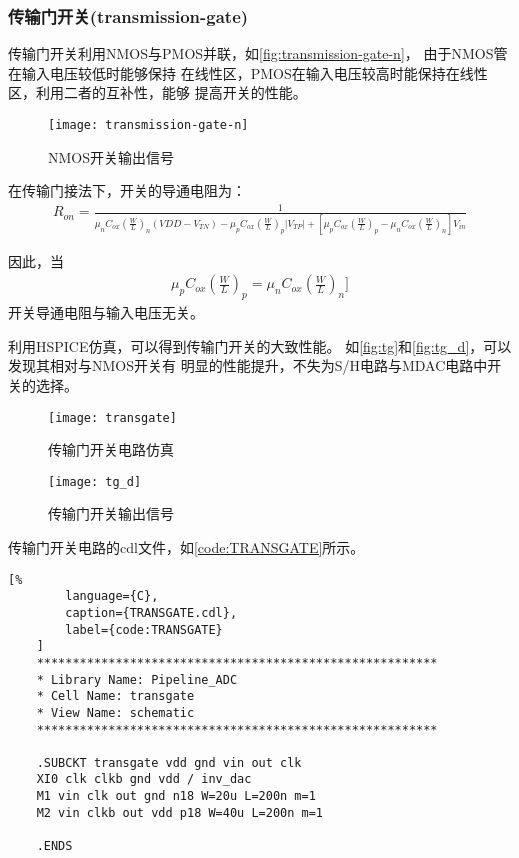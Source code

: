     \subsubsection{传输门开关(transmission-gate)}
    传输门开关利用NMOS与PMOS并联，如\autoref{fig:transmission-gate-n}，
    由于NMOS管在输入电压较低时能够保持
    在线性区，PMOS在输入电压较高时能保持在线性区，利用二者的互补性，能够
    提高开关的性能。
    \begin{figure}[H]
        \centering
        \texttt{[image: transmission-gate-n]}
        \caption{\label{fig:transmission-gate-n}NMOS开关输出信号}
    \end{figure}
    \par 在传输门接法下，开关的导通电阻为：
    \begin{align}
        R_{on} = \frac{1}{\mu_nC_{ox}(\frac{W}{L})_n(VDD-V_{TN}) - \mu_pC_{ox}(\frac{W}{L})_p|V_{TP}| + [\mu_pC_{ox}(\frac{W}{L})_p-\mu_nC_{ox}(\frac{W}{L})_n]V_{in} }
    \end{align}
    \par 因此，当
    \begin{align}
        \mu_pC_{ox}(\frac{W}{L})_p=\mu_nC_{ox}(\frac{W}{L})_n] 
    \end{align}
    开关导通电阻与输入电压无关。
    \par 利用HSPICE仿真，可以得到传输门开关的大致性能。
    如\autoref{fig:tg}和\autoref{fig:tg_d}，可以发现其相对与NMOS开关有
    明显的性能提升，不失为S/H电路与MDAC电路中开关的选择。
    \begin{figure}[H]
        \centering
        \texttt{[image: transgate]}
        \caption{\label{fig:tg}传输门开关电路仿真}
    \end{figure}
    \begin{figure}[H]
        \centering
        \texttt{[image: tg\_d]}
        \caption{\label{fig:tg_d}传输门开关输出信号}
    \end{figure}
    
    \par 传输门开关电路的cdl文件，如\autoref{code:TRANSGATE}所示。
    \begin{lstlisting}[%
        language={C},
        caption={TRANSGATE.cdl},
        label={code:TRANSGATE}
    ]
    ********************************************************
    * Library Name: Pipeline_ADC
    * Cell Name: transgate
    * View Name: schematic
    ********************************************************
    
    .SUBCKT transgate vdd gnd vin out clk
    XI0 clk clkb gnd vdd / inv_dac
    M1 vin clk out gnd n18 W=20u L=200n m=1
    M2 vin clkb out vdd p18 W=40u L=200n m=1
    
    .ENDS
    \end{lstlisting}

